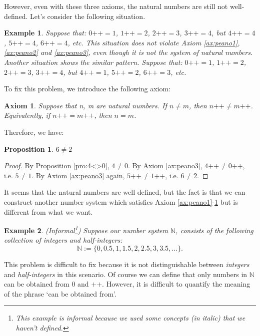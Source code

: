\documentclass[a4paper]{book}
\newtheorem*{proof}{\textit{Proof.}}
\newtheorem{axiom}{Axiom}[chapter]
\newtheorem{example}{Example}[section]
\newtheorem{proposition}{Proposition}[section]
\begin{document}
			However, even with these three axioms, the natural numbers are still not well-defined. Let's consider the following situation.
			\begin{example}
				Suppose that: $0\texttt{++}=1$, $1\texttt{++}=2$, $2\texttt{++}=3$, $3\texttt{++}=4$, but $4\texttt{++}=4$, $5\texttt{++}=4$, $6\texttt{++}=4$, etc. This situation does not violate Axiom \ref{ax:peano1}, \ref{ax:peano2} and \ref{ax:peano3}, even though it is not the system of natural numbers.\\
				Another situation shows the similar pattern. Suppose that: $0\texttt{++}=1$, $1\texttt{++}=2$, $2\texttt{++}=3$, $3\texttt{++}=4$, but $4\texttt{++}=1$, $5\texttt{++}=2$, $6\texttt{++}=3$, etc.
			\end{example}
			To fix this problem, we introduce the following axiom:
			\begin{axiom}
				\label{ax:peano4}
				Suppose that n, m are natural numbers. If $ n \neq m$, then $ n\texttt{++} \neq  m \texttt{++}$. Equivalently, if $ n\texttt{++} =  m \texttt{++}$, then $n = m$.
			\end{axiom}
			Therefore, we have:
			\begin{proposition}
				$6 \neq 2$
			\end{proposition}
			\begin{proof}
				By Proposition \ref{pro:4<>0}, $4 \neq 0$. By Axiom \ref{ax:peano3}, $4\texttt{++} \neq  0 \texttt{++}$, i.e. $5 \neq 1$. By Axiom \ref{ax:peano3} again, $5\texttt{++} \neq  1 \texttt{++}$, i.e. $6 \neq 2$.
			\end{proof}
			It seems that the natural numbers are well defined, but the fact is that we can construct another number system which satisfies Axiom \ref{ax:peano1}-\ref{ax:peano4} but is different from what we want.
			\begin{example}
				(Informal\footnote{This example is informal because we used some concepts (in italic) that we haven't defined.}) Suppose our number system $\mathbb{N}$, consists of the following collection of \textit{integers} and \textit{half-integers}:
				\begin{equation*}
					\mathbb{N} := \{0,0.5,1,1.5,2,2.5,3,3.5,...\}.
				\end{equation*}
      \end{example}
			This problem is difficult to fix because it is not distinguishable between \textit{integers} and \textit{half-integers} in this scenario. Of course we can define that only numbers in $\mathbb{N}$ can be obtained from $0$ and $\texttt{++}$. However, it is difficult to quantify the meaning of the phrase `can be obtained from'.\\
\end{document}
